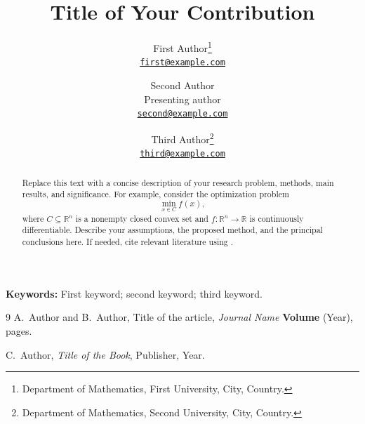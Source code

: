 \documentclass[11pt,a4paper]{article}
\title{Title of Your Contribution}
\author{%
  First Author\thanks{Department of Mathematics, First University, City, Country.}\\
  \small\href{mailto:first@example.com}{\texttt{first@example.com}}
  \and Second Author\footnotemark[1]\\
  \small Presenting author\\
  \small\href{mailto:second@example.com}{\texttt{second@example.com}}
  \and Third Author\thanks{Department of Mathematics, Second University, City, Country.}\\
  \small\href{mailto:third@example.com}{\texttt{third@example.com}}
}
\date{}
\begin{document}
\maketitle
\thispagestyle{empty}

\begin{abstract}
Replace this text with a concise description of your research problem,
methods, main results, and significance. 
For example, consider the optimization problem
\[
    \min_{x \in C} f(x),
\]
where $C \subseteq \mathbb{R}^{n}$ is a nonempty closed convex set and
$f\colon \mathbb{R}^{n} \to \mathbb{R}$ is continuously differentiable.
Describe your assumptions, the proposed method, and the principal
conclusions here. If needed, cite relevant literature using
\cite{sample-article,sample-book}.
\end{abstract}

\noindent\textbf{Keywords:} First keyword; second keyword; third keyword.


\begin{thebibliography}{9}
A.~Author and B.~Author,
Title of the article,
\emph{Journal Name} \textbf{Volume} (Year), pages.

C.~Author,
\emph{Title of the Book},
Publisher, Year.
\end{thebibliography}
\end{document}
